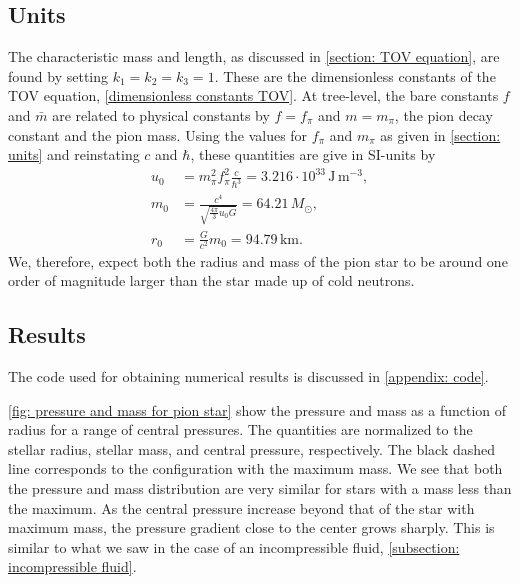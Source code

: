 \subsection{Units}

The characteristic mass and length, as discussed in \autoref{section: TOV equation}, are found by setting $k_1 = k_2 = k_3 = 1$.
These are the dimensionless constants of the TOV equation, \autoref{dimensionless constants TOV}.
At tree-level, the bare constants $f$ and $\bar m$ are related to physical constants by $f = f_\pi$ and $m = m_\pi$, the pion decay constant and the pion mass.
Using the values for $f_\pi$ and $m_\pi$ as given in \autoref{section: units} and reinstating $c$ and $\hbar$, these quantities are give in SI-units by
%
\begin{align}
    u_0 & =m_\pi^2 f_\pi^2 \frac{c}{\hbar^3}
    = 3.216\cdot 10^{33} \, \text{J}\,\text{m}^{-3}, \\
    m_0 & = \frac{c^4}{\sqrt{\frac{4 \pi}{ 3} u_0 G}} = 64.21\, M_\odot, \\
    r_0 & = \frac{G}{c^2} m_0 = 94.79 \, \text{km}.
\end{align}
%
We, therefore, expect both the radius and mass of the pion star to be around one order of magnitude larger than the star made up of cold neutrons.

\subsection{Results}

The code used for obtaining numerical results is discussed in \autoref{appendix: code}.

\autoref{fig: pressure and mass for pion star} show the pressure and mass as a function of radius for a range of central pressures.
The quantities are normalized to the stellar radius, stellar mass, and central pressure, respectively.
The black dashed line corresponds to the configuration with the maximum mass.
We see that both the pressure and mass distribution are very similar for stars with a mass less than the maximum.
As the central pressure increase beyond that of the star with maximum mass, the pressure gradient close to the center grows sharply.
This is similar to what we saw in the case of an incompressible fluid, \autoref{subsection: incompressible fluid}.

